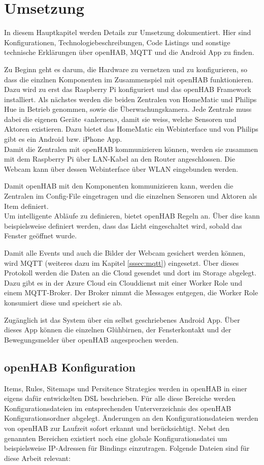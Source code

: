 \section{Umsetzung}
\label{sec:chapterRealization}

In diesem Hauptkapitel werden Details zur Umsetzung dokumentiert. Hier sind Konfigurationen, Technologiebeschreibungen, Code Listings und sonstige technische Erklärungen über openHAB, MQTT und die Android App zu finden.

Zu Beginn geht es darum, die Hardware zu vernetzen und zu konfigurieren, so dass die einzlnen Komponenten im Zusammenspiel mit openHAB funktionieren. Dazu wird zu erst das Raspberry Pi konfiguriert und das openHAB Framework installiert. Als nächstes werden die beiden Zentralen von HomeMatic und Philips Hue in Betrieb genommen, sowie die Überwachungskamera. Jede Zentrale muss dabei die eigenen Geräte «anlernen», damit sie weiss, welche Sensoren und Aktoren existieren. Dazu bietet das HomeMatic ein Webinterface und von Philips gibt es ein Android bzw. iPhone App. \\
Damit die Zentralen mit openHAB kommunizieren können, werden sie zusammen mit dem Raspberry Pi über LAN-Kabel an den Router angeschlossen. Die Webcam kann über dessen Webinterface über WLAN eingebunden werden.

Damit openHAB mit den Komponenten kommunizieren kann, werden die Zentralen im Config-File eingetragen und die einzelnen Sensoren und Aktoren als Item definiert.\\
Um intelligente Abläufe zu definieren, bietet openHAB Regeln an. Über dise kann beispielsweise definiert werden, dass das Licht eingeschaltet wird, sobald das Fenster geöffnet wurde.

Damit alle Events und auch die Bilder der Webcam gesichert werden können, wird MQTT (weiteres dazu im Kapitel \ref{sssec:mqtt}) eingesetzt. Über dieses Protokoll werden die Daten an die Cloud gesendet und dort im Storage abgelegt. Dazu gibt es in der Azure Cloud ein Clouddienst mit einer Worker Role und einem MQTT-Broker. Der Broker nimmt die Messages entgegen, die Worker Role konsumiert diese und speichert sie ab.

Zugänglich ist das System über ein selbst geschriebenes Android App. Über dieses App können die einzelnen Glühbirnen, der Fensterkontakt und der Bewegungsmelder über openHAB angesprochen werden.


\subsection{openHAB Konfiguration}
Items, Rules, Sitemaps und Persitence Strategies werden in openHAB in einer eigens dafür entwickelten DSL beschrieben. Für alle diese Bereiche werden Konfigurationsdateien im entsprechenden Unterverzeichnis des openHAB Konfigurationsordner abgelegt. Änderungen an den Konfigurationsdateien werden von openHAB zur Laufzeit sofort erkannt und berücksichtigt. Nebst den genannten Bereichen existiert noch eine globale Konfigurationsdatei um beispielsweise IP-Adressen für Bindings einzutragen. Folgende Dateien sind für diese Arbeit relevant:

